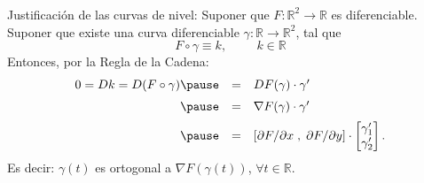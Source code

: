 \documentclass{beamer}
\begin{document}
\begin{frame}[t,fragile]
	\frametitle{\subsecname}
\begin{block}{\centering Justificación de las curvas de nivel:}
	Suponer que \(F: \mathbb{R} ^ 2 \longrightarrow \mathbb{R}\) 
	es diferenciable. \\ \pause
	Suponer que existe una curva diferenciable
	\(\gamma : \mathbb{R} \longrightarrow \mathbb{R} ^ 2\), \pause
	tal que 
	\[
		F \circ \gamma \equiv k,  \hspace{1cm} k \in \mathbb{R}
	\]
	\pause
	Entonces, por la Regla de la Cadena:
	\[
		\begin{array}{rcl}
			0 = Dk = D(F \circ \gamma ) \pause
			& = & DF (\gamma) \cdot \gamma ' \\[2mm]
			\pause
			& = & \nabla F (\gamma) \cdot \gamma ' \\[2mm]
			\pause 
			& = & [\partial F / \partial x \;,\; \partial F / \partial y] 
			 \cdot \begin{bmatrix}
				\gamma _1 ' \\ \gamma _2 '
			\end{bmatrix}.
		\end{array}
	\]
	\pause
	Es decir: \(\gamma(t)\) es ortogonal a \(\nabla F(\gamma (t))\),
	\(\forall t \in \mathbb{R}\).
\end{block}
\end{frame}
\end{document}
